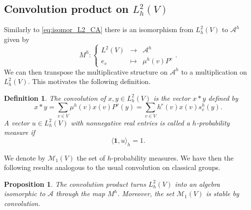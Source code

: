 \documentclass[10pt,11pt]{amsart}%
\newtheorem{definition}[theorem]{Definition}
\newtheorem{proposition}[theorem]{Proposition}
\begin{document}
\subsection{Convolution product on $L^2_h(V)$}
Similarly to \eqref{eq:isomor_L2_CA} there is an isomorphism from $L^2_h(V)$ to $\mathcal{A}^h$ given by
\begin{equation}\label{eq:isomor_L2h_CA}
M^h:\left\lbrace \begin{aligned} L^2(V)&\rightarrow &\mathcal{A}^h\\ e_v&\mapsto &\mu^h(v)P^v\end{aligned}\right..
\end{equation}
We can then transpose the multiplicative structure on $\mathcal{A}^h$ to a multiplication on $L^2_h(V)$. This motivates the following definition.
\begin{definition}\label{def:convolution}
The convolution of $x,y\in L^2_h(V)$ is the vector $x*y$ defined by
$$x*y=\sum_{v\in V}\mu^h(v)x(v)P^v(y)=\sum_{v\in V}h^r(v)x(v)s_v^h(y).$$
A vector $u\in L^2_h(V)$ with nonnegative real entries is called a $h$-probability measure if 
$$\langle \mathbf{1},u\rangle_h=1.$$
\end{definition} 
We denote by $\mathcal{M}_1(V)$ the set of $h$-probability measures. We have then the following results analogous to the usual convolution on classical groups.
\begin{proposition}\label{prop:structure_conv}
The convolution product turns $L^2_h(V)$ into an algebra isomorphic to $\mathcal{A}$ through the map $M^h$. Moreover, the set $\mathcal{M}_1(V)$ is stable by convolution.
\end{proposition}
\end{document}
